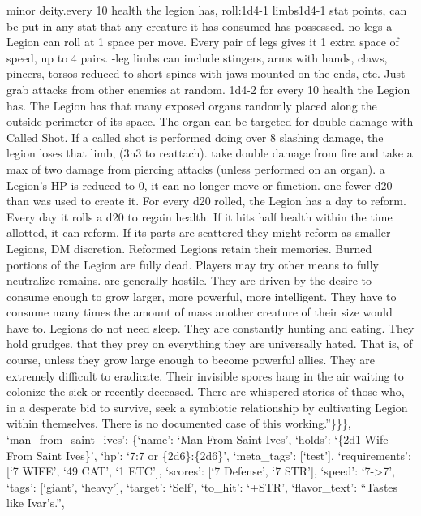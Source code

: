 \documentclass[
  letterpaper,
  DIV=11,
  numbers=noendperiod]{scrartcl}
\begin{document}
minor deity.\n\nFor every 10 health the legion has, roll:\n\n1d4-1
limbs\n\n1d4-1 stat points, can be put in any stat that any creature it
has consumed has possessed. \n\nWith no legs a Legion can roll at 1
space per move. Every pair of legs gives it 1 extra space of speed, up
to 4 pairs. \n\nNon-leg limbs can include stingers, arms with hands,
claws, pincers, torsos reduced to short spines with jaws mounted on the
ends, etc. Just grab attacks from other enemies at random.
\n\nRoll 1d4-2 for every 10 health the Legion has. The Legion has that
many exposed organs randomly placed along the outside perimeter of its
space. The organ can be targeted for double damage with Called Shot. If
a called shot is performed doing over 8 slashing damage, the legion
loses that limb, (3n3 to reattach). \n\nLegions take double damage from
fire and take a max of two damage from piercing attacks (unless
performed on an organ). \n\nWhen a Legion's HP is reduced to 0, it can
no longer move or function. \n\nRoll one fewer d20 than was used to
create it. For every d20 rolled, the Legion has a day to reform. Every
day it rolls a d20 to regain health. If it hits half health within the
time allotted, it can reform. If its parts are scattered they might
reform as smaller Legions, DM discretion. Reformed Legions retain their
memories. Burned portions of the Legion are fully dead. Players may try
other means to fully neutralize remains. \n\nLegions are generally
hostile. They are driven by the desire to consume enough to grow larger,
more powerful, more intelligent. They have to consume many times the
amount of mass another creature of their size would have to. Legions do
not need sleep. They are constantly hunting and eating. They hold
grudges. \n\nGiven that they prey on everything they are universally
hated. That is, of course, unless they grow large enough to become
powerful allies. They are extremely difficult to eradicate. Their
invisible spores hang in the air waiting to colonize the sick or
recently deceased. There are whispered stories of those who, in a
desperate bid to survive, seek a symbiotic relationship by cultivating
Legion within themselves. There is no documented case of this
working.''\}\}\}, `man\_from\_saint\_ives': \{`name': `Man From Saint
Ives', `holds': `\{2d1 Wife From Saint Ives\}', `hp': `7:7 or
\{2d6\}:\{2d6\}', `meta\_tags': {[}`test'{]}, `requirements': {[}`7
WIFE', `49 CAT', `1 ETC'{]}, `scores': {[}`7 Defense', `7 STR'{]},
`speed': `7-\textgreater7', `tags': {[}`giant', `heavy'{]}, `target':
`Self', `to\_hit': `+STR', `flavor\_text': ``Tastes like Ivar's.'',
\end{document}
